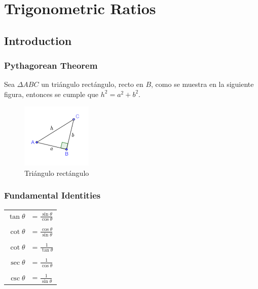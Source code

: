 \chapter{Trigonometric Ratios}

\section{Introduction}

\subsection{Pythagorean Theorem}

Sea $\Delta ABC$ un triángulo rectángulo, recto en $B$, como se muestra
en la siguiente figura, entonces se cumple que $h^2=a^2+b^2$.

\begin{figure}[ht]
    \centering
    \includegraphics[width=0.3\textwidth]{./images/figure-4.png}
    \caption{Triángulo rectángulo}
    \label{fig:pythagorean_theorem}
\end{figure}

\subsection{Fundamental Identities}

\begin{tabular}{rl}
    $\tan\theta$ &= $\frac{\sin\theta}{\cos\theta}$ \\ 
    \\
    $\cot\theta$ &= $\frac{\cos\theta}{\sin\theta}$ \\
    \\
    $\cot\theta$ &= $\frac{1}{\tan\theta}$ \\
    \\
    $\sec\theta$ &= $\frac{1}{\cos\theta}$ \\
    \\
    $\csc\theta$ &= $\frac{1}{\sin\theta}$ \\
\end{tabular}
